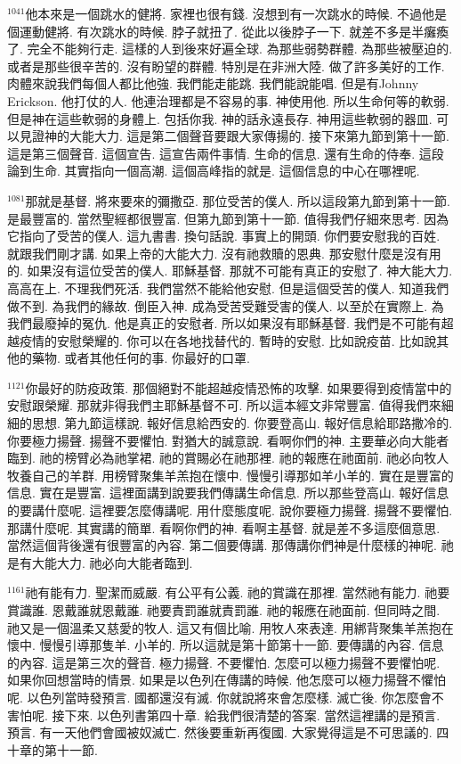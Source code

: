 \documentclass{book}
\begin{document}
$^{1041}$他本來是一個跳水的健將.
家裡也很有錢.
沒想到有一次跳水的時候.
不過他是個運動健將.
有次跳水的時候.
脖子就扭了.
從此以後脖子一下.
就差不多是半癱瘓了.
完全不能夠行走.
這樣的人到後來好遍全球.
為那些弱勢群體.
為那些被壓迫的.
或者是那些很辛苦的.
沒有盼望的群體.
特別是在非洲大陸.
做了許多美好的工作.
肉體來說我們每個人都比他強.
我們能走能跳.
我們能說能唱.
但是有Johnny Erickson.
他打仗的人.
他連治理都是不容易的事.
神使用他.
所以生命何等的軟弱.
但是神在這些軟弱的身體上.
包括你我.
神的話永遠長存.
神用這些軟弱的器皿.
可以見證神的大能大力.
這是第二個聲音要跟大家傳揚的.
接下來第九節到第十一節.
這是第三個聲音.
這個宣告.
這宣告兩件事情.
生命的信息.
還有生命的侍奉.
這段論到生命.
其實指向一個高潮.
這個高峰指的就是.
這個信息的中心在哪裡呢.

$^{1081}$那就是基督.
將來要來的彌撒亞.
那位受苦的僕人.
所以這段第九節到第十一節.
是最豐富的.
當然聖經都很豐富.
但第九節到第十一節.
值得我們仔細來思考.
因為它指向了受苦的僕人.
這九書書.
換句話說.
事實上的開頭.
你們要安慰我的百姓.
就跟我們剛才講.
如果上帝的大能大力.
沒有祂救贖的恩典.
那安慰什麼是沒有用的.
如果沒有這位受苦的僕人.
耶穌基督.
那就不可能有真正的安慰了.
神大能大力.
高高在上.
不理我們死活.
我們當然不能給他安慰.
但是這個受苦的僕人.
知道我們做不到.
為我們的緣故.
倒臣入神.
成為受苦受難受害的僕人.
以至於在實際上.
為我們最廢掉的冤仇.
他是真正的安慰者.
所以如果沒有耶穌基督.
我們是不可能有超越疫情的安慰榮耀的.
你可以在各地找替代的.
暫時的安慰.
比如說疫苗.
比如說其他的藥物.
或者其他任何的事.
你最好的口罩.

$^{1121}$你最好的防疫政策.
那個絕對不能超越疫情恐怖的攻擊.
如果要得到疫情當中的安慰跟榮耀.
那就非得我們主耶穌基督不可.
所以這本經文非常豐富.
值得我們來細細的思想.
第九節這樣說.
報好信息給西安的.
你要登高山.
報好信息給耶路撒冷的.
你要極力揚聲.
揚聲不要懼怕.
對猶大的誠意說.
看啊你們的神.
主要華必向大能者臨到.
祂的榜臂必為祂掌裙.
祂的賞賜必在祂那裡.
祂的報應在祂面前.
祂必向牧人牧養自己的羊群.
用榜臂聚集羊羔抱在懷中.
慢慢引導那如羊小羊的.
實在是豐富的信息.
實在是豐富.
這裡面講到說要我們傳講生命信息.
所以那些登高山.
報好信息的要講什麼呢.
這裡要怎麼傳講呢.
用什麼態度呢.
說你要極力揚聲.
揚聲不要懼怕.
那講什麼呢.
其實講的簡單.
看啊你們的神.
看啊主基督.
就是差不多這麼個意思.
當然這個背後還有很豐富的內容.
第二個要傳講.
那傳講你們神是什麼樣的神呢.
祂是有大能大力.
祂必向大能者臨到.

$^{1161}$祂有能有力.
聖潔而威嚴.
有公平有公義.
祂的賞識在那裡.
當然祂有能力.
祂要賞識誰.
恩戴誰就恩戴誰.
祂要責罰誰就責罰誰.
祂的報應在祂面前.
但同時之間.
祂又是一個溫柔又慈愛的牧人.
這又有個比喻.
用牧人來表達.
用綁背聚集羊羔抱在懷中.
慢慢引導那隻羊.
小羊的.
所以這就是第十節第十一節.
要傳講的內容.
信息的內容.
這是第三次的聲音.
極力揚聲.
不要懼怕.
怎麼可以極力揚聲不要懼怕呢.
如果你回想當時的情景.
如果是以色列在傳講的時候.
他怎麼可以極力揚聲不懼怕呢.
以色列當時發預言.
國都還沒有滅.
你就說將來會怎麼樣.
滅亡後.
你怎麼會不害怕呢.
接下來.
以色列書第四十章.
給我們很清楚的答案.
當然這裡講的是預言.
預言.
有一天他們會國被奴滅亡.
然後要重新再復國.
大家覺得這是不可思議的.
四十章的第十一節.
\end{document}
